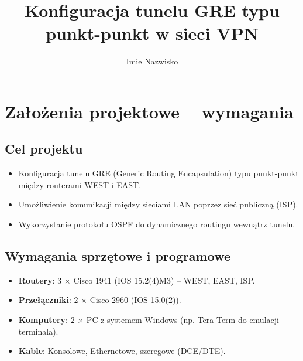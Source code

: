 \documentclass[12pt,twoside,a4paper,openany]{article}
\title{Konfiguracja tunelu GRE typu punkt-punkt w sieci VPN}		%
\author{Imie Nazwisko}
\begin{document}
\renewcommand{\figurename}{Rys.}    %
\renewcommand{\tablename}{Tab.}     %
\thispagestyle{empty}               %
\stronatytulowa                     %


\pagestyle{fancy}
\newpage

\renewcommand{\cftbeforesecskip}{8pt}
\renewcommand{\cftsecafterpnum}{\vskip 8pt}
\renewcommand{\cftparskip}{3pt}
\renewcommand{\cfttoctitlefont}{\Large\bfseries\sffamily}
\renewcommand{\cftsecfont}{\bfseries\sffamily}
\renewcommand{\cftsubsecfont}{\sffamily}
\renewcommand{\cftsubsubsecfont}{\sffamily}
\renewcommand{\cftparafont}{\sffamily}

\tableofcontents    %
\thispagestyle{fancy}
\newpage

\section{Założenia projektowe – wymagania}

\subsection{Cel projektu}
\begin{itemize}
    \item Konfiguracja tunelu GRE (Generic Routing Encapsulation) typu punkt-punkt między routerami WEST i EAST.
    \item Umożliwienie komunikacji między sieciami LAN poprzez sieć publiczną (ISP).
    \item Wykorzystanie protokołu OSPF do dynamicznego routingu wewnątrz tunelu.
\end{itemize}

\subsection{Wymagania sprzętowe i programowe}
\begin{itemize}
    \item \textbf{Routery}: 3 × Cisco 1941 (IOS 15.2(4)M3) – WEST, EAST, ISP.
    \item \textbf{Przełączniki}: 2 × Cisco 2960 (IOS 15.0(2)).
    \item \textbf{Komputery}: 2 × PC z systemem Windows (np. Tera Term do emulacji terminala).
    \item \textbf{Kable}: Konsolowe, Ethernetowe, szeregowe (DCE/DTE).
\end{itemize}
\end{document}
